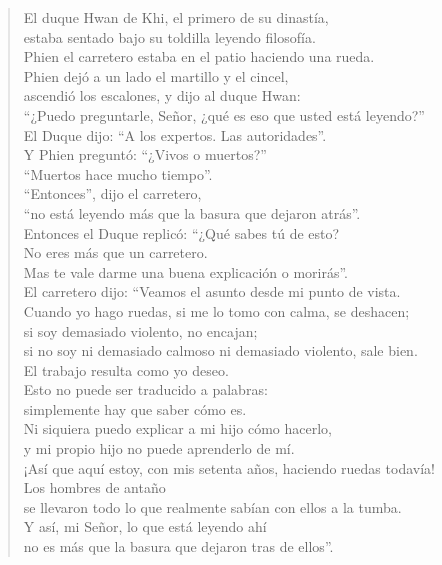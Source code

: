 \documentclass[hidelinks]{memoir}
\begin{document}
	\begin{quote}
		El duque Hwan de Khi, el primero de su dinastía,\\
		estaba sentado bajo su toldilla leyendo filosofía.\\
		Phien el carretero estaba en el patio haciendo una rueda.\\
		Phien dejó a un lado el martillo y el cincel,\\
		ascendió los escalones, y dijo al duque Hwan:\\
		``¿Puedo preguntarle, Señor, ¿qué es eso que usted está leyendo?''\\
		El Duque dijo: ``A los expertos. Las autoridades''.\\
		Y Phien preguntó: ``¿Vivos o muertos?''\\
		``Muertos hace mucho tiempo''.\\
		``Entonces'', dijo el carretero,\\
		``no está leyendo más que la basura que dejaron atrás''.\\
		Entonces el Duque replicó: ``¿Qué sabes tú de esto?\\
		No eres más que un carretero.\\
		Mas te vale darme una buena explicación o morirás''.\\
		El carretero dijo: ``Veamos el asunto desde mi punto de vista.\\
		Cuando yo hago ruedas, si me lo tomo con calma, se deshacen;\\
		si soy demasiado violento, no encajan;\\
		si no soy ni demasiado calmoso ni demasiado violento, sale bien.\\
		El trabajo resulta como yo deseo.\\
		Esto no puede ser traducido a palabras:\\
		simplemente hay que saber cómo es.\\
		Ni siquiera puedo explicar a mi hijo cómo hacerlo,\\
		y mi propio hijo no puede aprenderlo de mí.\\
		¡Así que aquí estoy, con mis setenta años, haciendo ruedas todavía!\\
		Los hombres de antaño\\
		se llevaron todo lo que realmente sabían con ellos a la tumba.\\
		Y así, mi Señor, lo que está leyendo ahí\\
		no es más que la basura que dejaron tras de ellos''.
	\end{quote}
	
\end{document}

